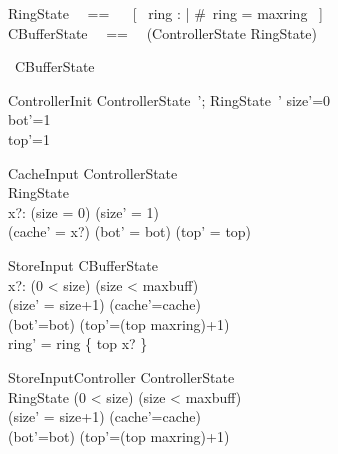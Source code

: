 \begin{zed}
    RingState ~~== ~~ [~ ring : \seq \nat | \#~ring = maxring ~] \\
    CBufferState ~~==~~ (ControllerState \lor RingState)
\end{zed}

\begin{cricusaction}
    \circstate\  CBufferState
\end{cricusaction}

\begin{schema}{ControllerInit}
    ControllerState~'; RingState~'
\where
    size'=0 \\
    bot'=1 \\
    top'=1
\end{schema}

\begin{schema}{CacheInput}
   \Delta ControllerState
       \\%
       \Xi RingState
        \\%
        x?:\nat
\where
        (size = 0) \land (size' = 1)
        \\%
        (cache' = x?) \land (bot' = bot) \land (top' = top)
\end{schema}

\begin{schema}{StoreInput}
    \Delta CBufferState
        \\%
        x?: \nat
\where
        (0 < size) \land (size < maxbuff)
        \\%
        (size' = size+1) \land (cache'=cache)
        \\%
        (bot'=bot) \land (top'=(top \mod maxring)+1)
        \\%
        ring' = ring \oplus \{ top \mapsto x? \}
\end{schema}

\begin{schema}{StoreInputController}
    \Delta ControllerState
        \\%
        \Xi RingState
\where
        (0 < size) \land (size < maxbuff)
        \\%
        (size' = size+1) \land (cache'=cache)
        \\%
        (bot'=bot) \land (top'=(top \mod maxring)+1)
\end{schema}

%
%

